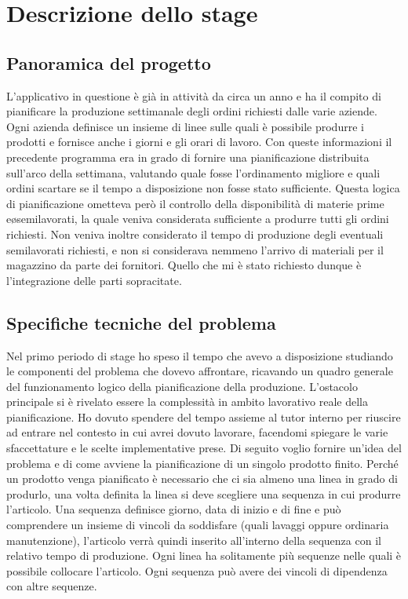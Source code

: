 \chapter{Descrizione dello stage}

\section{Panoramica del progetto}
L'applicativo in questione è già in attività da circa un anno e ha il compito di pianificare la produzione settimanale degli ordini richiesti dalle varie aziende. Ogni azienda definisce un insieme di linee sulle quali è possibile produrre i prodotti e fornisce anche i giorni e gli orari di lavoro.
Con queste informazioni il precedente programma era in grado di fornire una pianificazione distribuita sull'arco della settimana, valutando quale fosse l'ordinamento migliore e quali ordini scartare se il tempo a disposizione non fosse stato sufficiente. Questa logica di pianificazione ometteva però il controllo della disponibilità di materie prime e\o semilavorati, la quale veniva considerata sufficiente a produrre tutti gli ordini richiesti. Non veniva inoltre considerato il tempo di produzione degli eventuali semilavorati richiesti, e non si considerava nemmeno l'arrivo di materiali per il magazzino da parte dei fornitori.
Quello che mi è stato richiesto dunque è l'integrazione delle parti sopracitate.

\section{Specifiche tecniche del problema}

Nel primo periodo di stage ho speso il tempo che avevo a disposizione studiando le componenti del problema che dovevo affrontare, ricavando un quadro generale del funzionamento logico della pianificazione della produzione. L'ostacolo principale si è rivelato essere la complessità in ambito lavorativo reale della pianificazione. Ho dovuto spendere del tempo assieme al tutor interno per riuscire ad entrare nel contesto in cui avrei dovuto lavorare, facendomi spiegare le varie sfaccettature e le scelte implementative prese. Di seguito voglio fornire un'idea del problema e di come avviene la pianificazione di un singolo prodotto finito.
Perché un prodotto venga pianificato è necessario che ci sia almeno una linea in grado di produrlo, una volta definita la linea si deve scegliere una sequenza in cui produrre l'articolo. Una sequenza definisce giorno, data di inizio e di fine e può comprendere un insieme di vincoli da soddisfare (quali lavaggi oppure ordinaria manutenzione), l'articolo verrà quindi inserito all'interno della sequenza con il relativo tempo di produzione. Ogni linea ha solitamente più sequenze nelle quali è possibile collocare l'articolo. Ogni sequenza può avere dei vincoli di dipendenza con altre sequenze.


